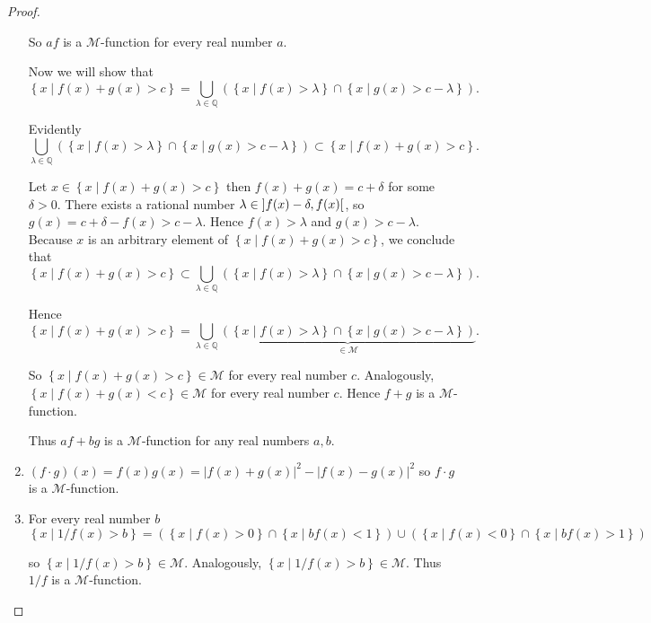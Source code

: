 \begin{proof}
\begin{enumerate}[label={(\arabic*)}]
              So \( af \) is a \( \mathscr{M} \)-function for every real number \( a \).

              Now we will show that
              \[
                  \left\{ x \mid f(x) + g(x) > c \right\} = \bigcup_{\lambda \in \mathbb{Q}} \left( \left\{ x \mid f(x) > \lambda \right\} \cap \left\{ x \mid g(x) > c - \lambda \right\} \right).
              \]

              Evidently
              \[
                  \bigcup_{\lambda \in \mathbb{Q}} \left( \left\{ x \mid f(x) > \lambda \right\} \cap \left\{ x \mid g(x) > c - \lambda \right\} \right) \subset \left\{ x \mid f(x) + g(x) > c \right\}.
              \]

              Let \( x \in \left\{ x \mid f(x) + g(x) > c \right\} \) then \( f(x) + g(x) = c + \delta \) for some \( \delta > 0 \). There exists a rational number \( \lambda \in \left\rbrack{f(x) - \delta, f(x)}\right\lbrack \), so \( g(x) = c + \delta - f(x) > c - \lambda \). Hence \( f(x) > \lambda \) and \( g(x) > c - \lambda \). Because \( x \) is an arbitrary element of \(  \left\{ x \mid f(x) + g(x) > c \right\} \), we conclude that
              \[
                  \left\{ x \mid f(x) + g(x) > c \right\} \subset \bigcup_{\lambda \in \mathbb{Q}} \left( \left\{ x \mid f(x) > \lambda \right\} \cap \left\{ x \mid g(x) > c - \lambda \right\} \right).
              \]

              Hence
              \[
                  \left\{ x \mid f(x) + g(x) > c \right\} = \bigcup_{\lambda \in \mathbb{Q}} \underbrace{\left( \left\{ x \mid f(x) > \lambda \right\} \cap \left\{ x \mid g(x) > c - \lambda \right\} \right)}_{\in \mathscr{M}}.
              \]

              So \( \left\{ x \mid f(x) + g(x) > c \right\} \in \mathscr{M} \) for every real number \( c \). Analogously, \( \left\{ x \mid f(x) + g(x) < c \right\} \in \mathscr{M} \) for every real number \( c \). Hence \( f + g \) is a \( \mathscr{M} \)-function.

              Thus \( af + bg \) is a \( \mathscr{M} \)-function for any real numbers \( a, b \).
        \item \( (f\cdot g)(x) = f(x)g(x) = {\left\vert f(x) + g(x) \right\vert}^{2} - {\left\vert f(x) - g(x) \right\vert}^{2} \) so \( f\cdot g \) is a \( \mathscr{M} \)-function.
        \item For every real number \( b \)
              \[
                  \left\{ x \mid 1/f(x) > b \right\} = (\left\{ x \mid f(x) > 0 \right\} \cap \left\{ x \mid bf(x) < 1 \right\}) \cup (\left\{ x \mid f(x) < 0 \right\} \cap \left\{ x \mid bf(x) > 1 \right\})
              \]

              so \( \left\{ x \mid 1/f(x) > b \right\} \in \mathscr{M} \). Analogously, \( \left\{ x \mid 1/f(x) > b \right\} \in \mathscr{M} \). Thus \( 1/f \) is a \( \mathscr{M} \)-function.
    \end{enumerate}
\end{proof}


